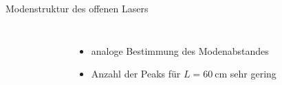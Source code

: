 \documentclass[10pt, aspectratio=169]{beamer}
\begin{document}
\begin{frame}{Modenstruktur des offenen Lasers}
  \begin{columns}
    \begin{figure}
    \end{figure}
    \begin{itemize}
    \item<1-> analoge Bestimmung des Modenabstandes
    \item<2-> Anzahl der Peaks f\"ur \(L=\SI{60}{\centi\meter}\) sehr
      gering
    \end{itemize}
  \end{columns}
\end{frame}
\end{document}
